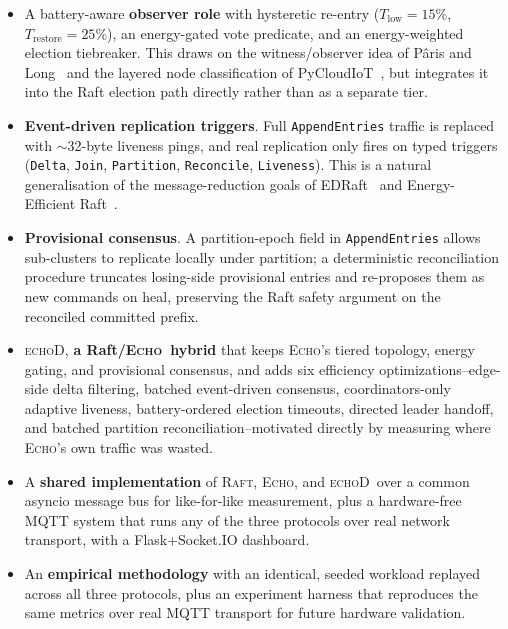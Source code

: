 \documentclass[conference]{IEEEtran}
\newcommand{\echoproto}{\textsc{Echo}\xspace}
\newcommand{\raftproto}{\textsc{Raft}\xspace}
\newcommand{\echodproto}{\textsc{echoD}\xspace}
\begin{document}
\begin{itemize}
\item A battery-aware \textbf{observer role} with hysteretic re-entry
  ($T_{\text{low}}{=}15\%$, $T_{\text{restore}}{=}25\%$), an energy-gated
  vote predicate, and an energy-weighted election tiebreaker. This draws
  on the witness/observer idea of Pâris and Long~\cite{paris2015reducing}
  and the layered node classification of
  PyCloudIoT~\cite{blanco2023pycloudiot}, but integrates it into the Raft
  election path directly rather than as a separate tier.
\item \textbf{Event-driven replication triggers}. Full
  \texttt{AppendEntries} traffic is replaced with $\sim$32-byte liveness
  pings, and real replication only fires on typed triggers (\texttt{Delta},
  \texttt{Join}, \texttt{Partition}, \texttt{Reconcile},
  \texttt{Liveness}). This is a natural generalisation of the
  message-reduction goals of EDRaft~\cite{barros2023edraft} and
  Energy-Efficient Raft~\cite{nakagawa2017energy}.
\item \textbf{Provisional consensus}. A partition-epoch field in
  \texttt{AppendEntries} allows sub-clusters to replicate locally under
  partition; a deterministic reconciliation procedure truncates losing-side
  provisional entries and re-proposes them as new commands on heal,
  preserving the Raft safety argument on the reconciled committed prefix.
\item \echodproto, \textbf{a Raft/\echoproto\ hybrid} that keeps
  \echoproto's tiered topology, energy gating, and provisional
  consensus, and adds six efficiency optimizations--edge-side delta
  filtering, batched event-driven consensus, coordinators-only adaptive
  liveness, battery-ordered election timeouts, directed leader handoff,
  and batched partition reconciliation--motivated directly by measuring
  where \echoproto's own traffic was wasted.
\item A \textbf{shared implementation} of \raftproto, \echoproto, and
  \echodproto\ over a common asyncio message bus for like-for-like
  measurement, plus a hardware-free MQTT system that runs any of the
  three protocols over real network transport, with a Flask+Socket.IO
  dashboard.
\item An \textbf{empirical methodology} with an identical, seeded
  workload replayed across all three protocols, plus an experiment
  harness that reproduces the same metrics over real MQTT transport for
  future hardware validation.
\end{itemize}
\end{document}
